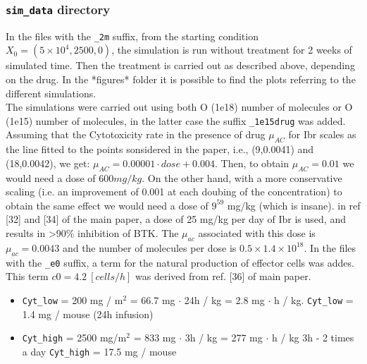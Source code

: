 \subsubsection{\texttt{sim\_data} directory}
In the files with the \texttt{\_2m} suffix, from the starting condition $X_0=(5 \times 10^4,2500,0)$, the simulation is run without treatment for 2 weeks of simulated time. Then the treatment is carried out as described above, depending on the drug. In the *figures* folder it is possible to find the plots referring to the different simulations.\\
The simulations were carried out using both O (1e18) number of molecules or O (1e15) number of molecules, in the latter case the suffix \texttt{\_1e15drug} was added.
Assuming that the Cytotoxicity rate in the presence of drug $\mu_{AC}$ for Ibr scales as the line fitted to the points sonsidered in the paper, i.e., (9,0.0041) and (18,0.0042), we get: $\mu_{AC}=0.00001 \cdot dose + 0.004$.  Then, to obtain $\mu_{AC}=0.01$ we would need a dose of $600 mg/kg$. On the other hand, with a more conservative scaling (i.e. an improvement of 0.001 at each doubing of the concentration) to obtain the same effect we would need a dose of $9^{59}$ mg/kg (which is insane).
in ref [32] and [34] of the main paper, a dose of 25 mg/kg per day of Ibr is used, and results in >90\% inhibition of BTK. The $\mu_{ac}$ associated with this dose is $\mu_{ac} = 0.0043$ and the number of molecules per dose is $0.5 \times 1.4 \times 10^{18}$.
In the files with the \texttt{\_e0} suffix, a term for the natural production of effector cells was addes. This term $c0 = 4.2 \ [cells/h]$ was derived from ref. [36] of main paper.
\begin{itemize}
	\item \texttt{Cyt\_low} = 200 mg / m$^2$ = 66.7 mg $\cdot$ 24h / kg = 2.8 mg $\cdot$ h / kg. \texttt{Cyt\_low} = 1.4 mg / mouse (24h infusion)
	\item \texttt{Cyt\_high} = 2500 mg/m$^2$ = 833 mg $\cdot$ 3h / kg = 277 mg $\cdot$ h / kg 3h - 2 times a day \texttt{Cyt\_high} = 17.5 mg / mouse
\end{itemize}
